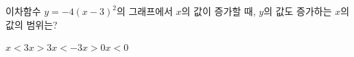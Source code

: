 이차함수 $y=-4(x-3)^2$의 그래프에서 $x$의 값이 증가할 때, $y$의 값도 증가하는 $x$의 값의 범위는?
\begin{choices32}{$x<3$}{$x>3$}{$x<-3$}{$x>0$}{$x<0$}\end{choices32}
